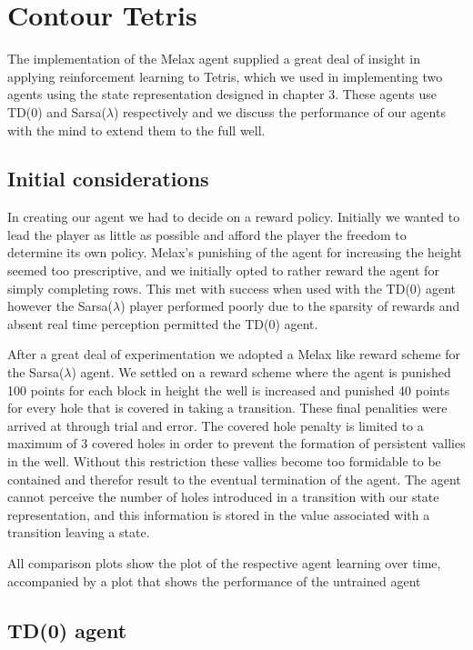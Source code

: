 \documentclass{rucsthesis}
\begin{document}
\chapter{Contour Tetris}

The implementation of the Melax agent supplied a great deal of insight in applying reinforcement learning to Tetris, which we used in implementing two agents using the state representation designed in chapter 3.  These agents use TD(0) and Sarsa($\lambda$) respectively and we discuss the performance of our agents with the mind to extend them to the full well.

\section{Initial considerations}

In creating our agent we had to decide on a reward policy. Initially we wanted to lead the player as little as possible and afford the player the freedom to determine its own policy. Melax's punishing of the agent for increasing the height seemed too prescriptive, and we initially opted to rather reward the agent for simply completing rows. This met with success when used with the TD(0) agent however the Sarsa($\lambda$) player performed poorly due to the sparsity of rewards and absent real time perception permitted the TD(0) agent.

After a great deal of experimentation we adopted a  Melax like reward scheme for the Sarsa($\lambda$) agent. We settled on a reward scheme where the agent is punished 100 points for each block in height the well is increased and punished 40 points for every hole that is covered in taking a transition. These final penalities were arrived at through trial and error. The covered hole penalty is limited to a maximum of 3 covered holes in order to prevent the formation of persistent vallies in the well. Without this restriction these vallies become too formidable to be contained and therefor result to the eventual termination of the agent.  The agent cannot perceive the number of holes introduced in a transition with our state representation, and this information is stored in the value associated with a transition leaving a state.

All comparison plots show the plot of the respective agent learning over time, accompanied by a plot that shows the performance of the untrained agent

\section{TD(0) agent}
\end{document}
